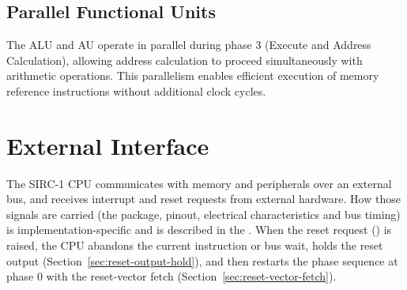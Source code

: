 \subsection{Parallel Functional Units}

The ALU and AU operate in parallel during phase 3 (Execute and Address Calculation), allowing address calculation to
proceed simultaneously with arithmetic operations. This parallelism enables efficient execution of memory reference
instructions without additional clock cycles.

\section{External Interface}

The SIRC-1 CPU communicates with memory and peripherals over an external bus, and receives interrupt and reset requests
from external hardware. How those signals are carried (the package, pinout, electrical characteristics and bus timing)
is implementation-specific and is described in the \hwmanual{}. When the reset request () is raised,
the CPU abandons the current instruction or bus wait, holds the reset output (Section~\ref{sec:reset-output-hold}), and
then restarts the phase sequence at phase 0 with the reset-vector fetch (Section~\ref{sec:reset-vector-fetch}).
